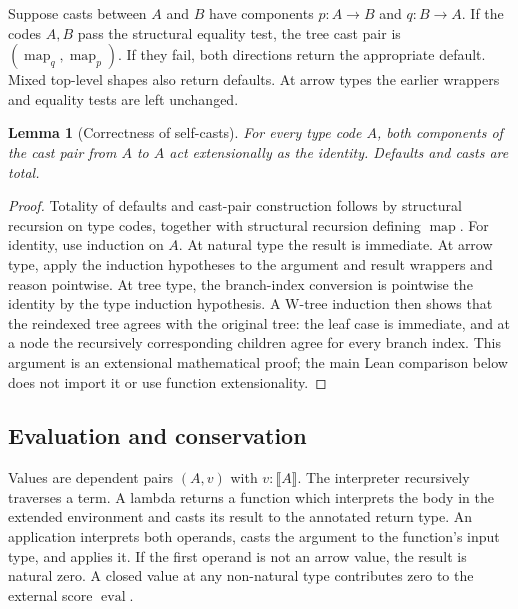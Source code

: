 \documentclass[11pt]{article}
\newtheorem{lemma}[theorem]{Lemma}
\theoremstyle{definition}
\newcommand{\ev}{\operatorname{eval}}
\begin{document}
Suppose casts between $A$ and $B$ have components $p:A\to B$ and $q:B\to A$.
If the codes $A,B$ pass the structural equality test, the tree cast pair is
$(\operatorname{map}_q,\operatorname{map}_p)$. If they fail, both directions
return the appropriate default. Mixed top-level shapes also return defaults.
At arrow types the earlier wrappers and equality tests are left unchanged.

\begin{lemma}[Correctness of self-casts]\label{lem:selfcast}
For every type code $A$, both components of the cast pair from $A$ to $A$ act
extensionally as the identity. Defaults and casts are total.
\end{lemma}
\begin{proof}
Totality of defaults and cast-pair construction follows by structural recursion
on type codes, together with structural recursion defining $\operatorname{map}$.
For identity, use induction on $A$. At natural type the result is immediate.
At arrow type, apply the induction hypotheses to the argument and result
wrappers and reason pointwise. At tree type, the branch-index conversion is
pointwise the identity by the type induction hypothesis. A W-tree induction
then shows that the reindexed tree agrees with the original tree: the leaf
case is immediate, and at a node the recursively corresponding children agree
for every branch index. This argument is an extensional mathematical proof;
the main Lean comparison below does not import it or use function extensionality.
\end{proof}

\subsection{Evaluation and conservation}
Values are dependent pairs $(A,v)$ with $v:\llbracket A\rrbracket$. The
interpreter recursively traverses a term. A lambda returns a function which
interprets the body in the extended environment and casts its result to the
annotated return type. An application interprets both operands, casts the
argument to the function's input type, and applies it. If the first operand is
not an arrow value, the result is natural zero. A closed value at any non-natural
type contributes zero to the external score $\ev$.
\end{document}
